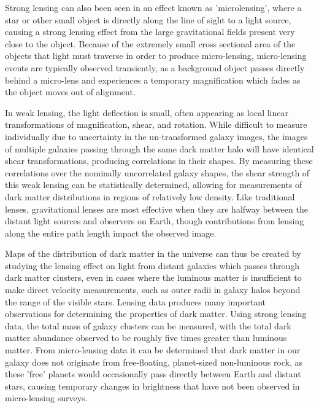 Strong lensing can also been seen in an effect known as 'microlensing', where a star or other small object is directly along the line of sight to a light source, causing a strong lensing effect from the large gravitational fields present very close to the object.
Because of the extremely small cross sectional area of the objects that light must traverse in order to produce micro-lensing, micro-lensing events are typically observed transiently, as a background object passes directly behind a micro-lens and experiences a temporary magnification which fades as the object moves out of alignment. 

In weak lensing, the light deflection is small, often appearing as local linear transformations of magnification, shear, and rotation. 
While difficult to measure individually due to uncertainty in the un-transformed galaxy images, the images of multiple galaxies passing through the same dark matter halo will have identical shear transformations, producing correlations in their shapes.
By measuring these correlations over the nominally uncorrelated galaxy shapes, the shear strength of this weak lensing can be statistically determined, allowing for measurements of dark matter distributions in regions of relatively low density.
Like traditional lenses, gravitational lenses are most effective when they are halfway between the distant light sources and observers on Earth, though contributions from lensing along the entire path length impact the observed image.

Maps of the distribution of dark matter in the universe can thus be created by studying the lensing effect on light from distant galaxies which passes through dark matter clusters, even in cases where the luminous matter is insufficient to make direct velocity measurements, such as outer radii in galaxy halos beyond the range of the visible stars.
Lensing data produces many important observations for determining the properties of dark matter.
Using strong lensing data, the total mass of galaxy clusters can be measured, with the total dark matter abundance observed to be roughly five times greater than luminous matter.
From micro-lensing data it can be determined that dark matter in our galaxy does not originate from free-floating, planet-sized non-luminous rock, as these 'free' planets would occasionally pass directly between Earth and distant stars, causing temporary changes in brightness that have not been observed in micro-lensing surveys.

